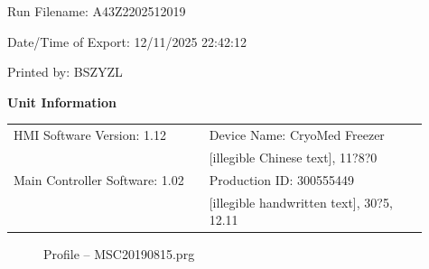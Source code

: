\documentclass[UTF8,10pt,a4paper,fontset=fandol]{ctexart}
\newcommand{\fieldvalue}[1]{#1}
\newcommand{\handwritten}[1]{#1}
\begin{document}
\noindent
Run Filename:
\fieldvalue{A43Z2202512019}

\noindent
Date/Time of Export:
\fieldvalue{12/11/2025 22:42:12}

\noindent
Printed by:
\fieldvalue{BSZYZL}

\medskip
\noindent
\textbf{Unit Information}

\noindent
\begin{tabular}{@{}p{0.43\linewidth}p{0.48\linewidth}@{}}
HMI Software Version:
\fieldvalue{1.12}
&
Device Name:
\fieldvalue{CryoMed Freezer}
\\
&
\handwritten{[illegible Chinese text], 11?8?0}
\\[-1pt]
Main Controller Software:
\fieldvalue{1.02}
&
Production ID:
\fieldvalue{300555449}
\\
&
\handwritten{[illegible handwritten text], 30?5, 12.11}
\end{tabular}

\medskip
\begin{figure}[h]
\centering
{}
\caption{Profile -- MSC20190815.prg}
\end{figure}
\end{document}
